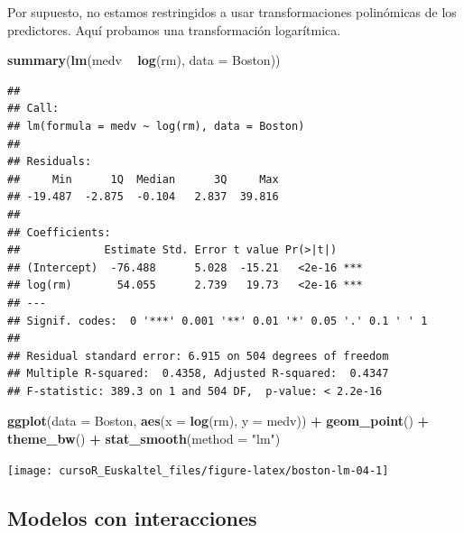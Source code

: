 \documentclass[]{book}
\newenvironment{Shaded}{\begin{snugshade}}{\end{snugshade}}
\newcommand{\KeywordTok}[1]{\textcolor[rgb]{0.13,0.29,0.53}{\textbf{#1}}}
\newcommand{\DataTypeTok}[1]{\textcolor[rgb]{0.13,0.29,0.53}{#1}}
\newcommand{\StringTok}[1]{\textcolor[rgb]{0.31,0.60,0.02}{#1}}
\newcommand{\OperatorTok}[1]{\textcolor[rgb]{0.81,0.36,0.00}{\textbf{#1}}}
\newcommand{\NormalTok}[1]{#1}
\begin{document}
Por supuesto, no estamos restringidos a usar transformaciones
polinómicas de los predictores. Aquí probamos una transformación
logarítmica.

\begin{Shaded}
\begin{Highlighting}[]
\KeywordTok{summary}\NormalTok{(}\KeywordTok{lm}\NormalTok{(medv }\OperatorTok{~}\StringTok{ }\KeywordTok{log}\NormalTok{(rm), }\DataTypeTok{data =}\NormalTok{ Boston))}
\end{Highlighting}
\end{Shaded}

\begin{verbatim}
## 
## Call:
## lm(formula = medv ~ log(rm), data = Boston)
## 
## Residuals:
##     Min      1Q  Median      3Q     Max 
## -19.487  -2.875  -0.104   2.837  39.816 
## 
## Coefficients:
##             Estimate Std. Error t value Pr(>|t|)    
## (Intercept)  -76.488      5.028  -15.21   <2e-16 ***
## log(rm)       54.055      2.739   19.73   <2e-16 ***
## ---
## Signif. codes:  0 '***' 0.001 '**' 0.01 '*' 0.05 '.' 0.1 ' ' 1
## 
## Residual standard error: 6.915 on 504 degrees of freedom
## Multiple R-squared:  0.4358, Adjusted R-squared:  0.4347 
## F-statistic: 389.3 on 1 and 504 DF,  p-value: < 2.2e-16
\end{verbatim}

\begin{Shaded}
\begin{Highlighting}[]
\KeywordTok{ggplot}\NormalTok{(}\DataTypeTok{data =}\NormalTok{ Boston, }\KeywordTok{aes}\NormalTok{(}\DataTypeTok{x =} \KeywordTok{log}\NormalTok{(rm), }\DataTypeTok{y =}\NormalTok{ medv)) }\OperatorTok{+}
\StringTok{  }\KeywordTok{geom_point}\NormalTok{() }\OperatorTok{+}
\StringTok{  }\KeywordTok{theme_bw}\NormalTok{() }\OperatorTok{+}\StringTok{ }
\StringTok{  }\KeywordTok{stat_smooth}\NormalTok{(}\DataTypeTok{method =} \StringTok{"lm"}\NormalTok{)}
\end{Highlighting}
\end{Shaded}

\begin{center}\texttt{[image: cursoR\_Euskaltel\_files/figure-latex/boston-lm-04-1]} \end{center}

\subsection{Modelos con interacciones}\label{modelos-con-interacciones}
\end{document}
